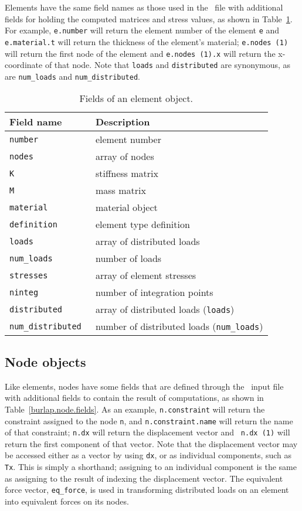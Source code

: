 Elements have the same field names as those used in the \felt\ file
with additional fields for holding the computed matrices and stress
values, as shown in Table~\ref{burlap.element.fields}.  For example,
{\tt e.number} will return the element number of the element {\tt e}
and {\tt e.material.t} will return the thickness of the element's
material; {\tt e.nodes (1)} will return the first node of the element
and {\tt e.nodes (1).x} will return the x-coordinate of that node.
Note that {\tt loads} and {\tt distributed} are synonymous, as are
{\tt num\_loads} and {\tt num\_distributed}.

{\scriptsize
\begin{table}[htbp]
\begin{center}
\begin{tabular}{l|l}
Field name		& Description					\\
\hline
\tt number		& element number				\\
\tt nodes		& array of nodes				\\
\tt K			& stiffness matrix				\\
\tt M			& mass matrix					\\
\tt material		& material object				\\
\tt definition		& element type definition			\\
\tt loads		& array of distributed loads			\\
\tt num\_loads		& number of loads				\\
\tt stresses		& array of element stresses			\\
\tt ninteg		& number of integration points			\\
\tt distributed		& array of distributed loads ({\tt loads})	\\
\tt num\_distributed	& number of distributed loads ({\tt num\_loads})\\
\end{tabular}
\caption{Fields of an element object.}
\label{burlap.element.fields}
\end{center}
\end{table}}


\subsection{Node objects}

Like elements, nodes have some fields that are defined through the
\felt\ input file with additional fields to contain the result of
computations, as shown in Table~\ref{burlap.node.fields}.  As an
example, {\tt n.constraint} will return the constraint assigned to the
node {\tt n}, and {\tt n.constraint.name} will return the name of that
constraint; {\tt n.dx} will return the displacement vector and {\tt
n.dx (1)} will return the first component of that vector.  Note that
the displacement vector may be accessed either as a vector by using
{\tt dx}, or as individual components, such as {\tt Tx}.  This is
simply a shorthand; assigning to an individual component is the same
as assigning to the result of indexing the displacement vector.  The
equivalent force vector, {\tt eq\_force}, is used in transforming
distributed loads on an element into equivalent forces on its nodes.

